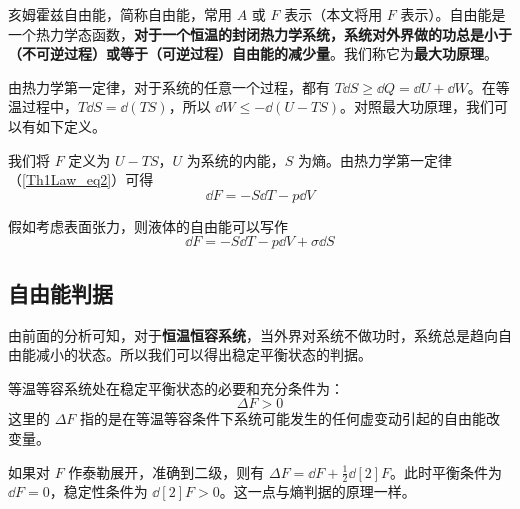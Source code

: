 

亥姆霍兹自由能，简称自由能，常用 $A$ 或 $F$ 表示（本文将用 $F$ 表示）。自由能是一个热力学态函数，\textbf{对于一个恒温的封闭热力学系统，系统对外界做的功总是小于（不可逆过程）或等于（可逆过程）自由能的减少量}。我们称它为\textbf{最大功原理}。

由热力学第一定律，对于系统的任意一个过程，都有 $T\dd S\ge \dd Q=\dd U+\dd W$。在等温过程中，$T\dd S=\dd (TS)$，所以 $\dd W\le - \dd (U-TS)$。对照最大功原理，我们可以有如下定义。

我们将 $F$ 定义为 $U-TS$，$U$ 为系统的内能，$S$ 为熵。由热力学第一定律（\autoref{Th1Law_eq2}）可得
\begin{equation}
\dd F=-S\dd T-p\dd V
\end{equation}

假如考虑表面张力，则液体的自由能可以写作
\begin{equation}
\dd F=-S\dd T-p \dd V+\sigma \dd S
\end{equation}
\subsection{自由能判据}
由前面的分析可知，对于\textbf{恒温恒容系统}，当外界对系统不做功时，系统总是趋向自由能减小的状态。所以我们可以得出稳定平衡状态的判据。

等温等容系统处在稳定平衡状态的必要和充分条件为：
\begin{equation}
\Delta F>0
\end{equation}
这里的 $\Delta F$ 指的是在等温等容条件下系统可能发生的任何虚变动引起的自由能改变量。

如果对 $F$ 作泰勒展开，准确到二级，则有 $\Delta F=\dd F+\frac{1}{2}\dd[2]{F}$。此时平衡条件为 $\dd F=0$，稳定性条件为 $\dd[2]{F}>0$。这一点与熵判据的原理一样。
